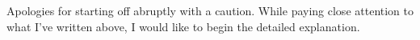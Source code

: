 \documentclass{ltjsbook}
\begin{document}
Apologies for starting off abruptly with a caution. While paying close attention to what I've written above, I would like to begin the detailed explanation.

\end{document}

